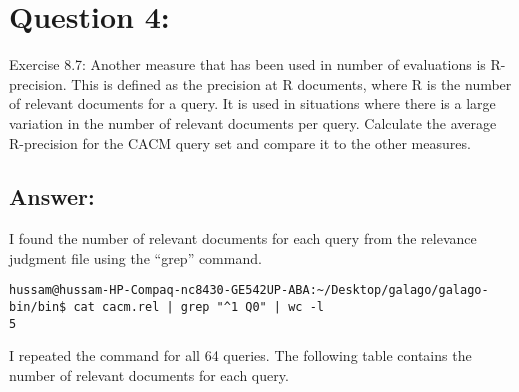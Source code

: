 \section*{Question 4:}
Exercise 8.7: 
Another measure that has been used in number of evaluations is R-precision. This is defined as the precision at R documents, where R is the number of relevant documents for a query. It is used in situations where there is a large variation in the number of relevant documents per query. Calculate the average R-precision for the CACM query set and compare it to the other measures.

\subsection*{Answer:}

I found the number of relevant documents for each query from the relevance judgment file using the ``grep'' command.
\begin{lstlisting}[breakatwhitespace=〈false)]
hussam@hussam-HP-Compaq-nc8430-GE542UP-ABA:~/Desktop/galago/galago-bin/bin$ cat cacm.rel | grep "^1 Q0" | wc -l
5
\end{lstlisting}
I repeated the command for all 64 queries. The following table contains the number of relevant documents for each query.

